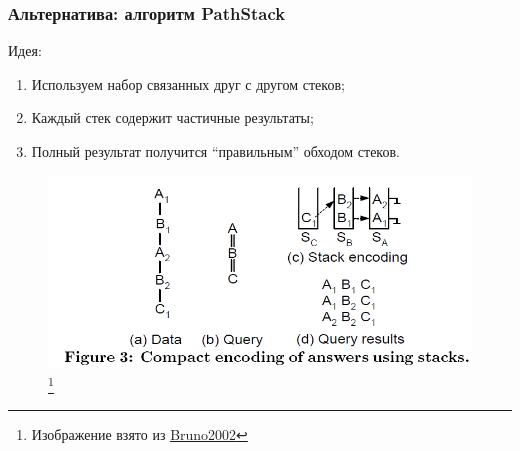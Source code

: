 \documentclass{beamer}
\begin{document}
\begin{frame}
\frametitle{Альтернатива: алгоритм PathStack}
Идея:
\begin{enumerate}
  \item Используем набор связанных друг с другом стеков;
  \item Каждый стек содержит частичные результаты;
  \item Полный результат получится ``правильным'' обходом стеков.
\end{enumerate}

\begin{figure}[htb]
\includegraphics[width=\textwidth,height=0.50\textheight,keepaspectratio]{xmlalg-example.png} 
\footnote{\tiny{Изображение взято из \url{Bruno2002}}}
\end{figure}    

\end{frame}
\end{document}
